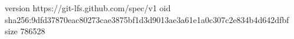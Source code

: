 version https://git-lfs.github.com/spec/v1
oid sha256:9dfd37870eac80273cae3875bf1d3d9013ae3a61e1a0c307c2e834b4d642dfbf
size 786528
